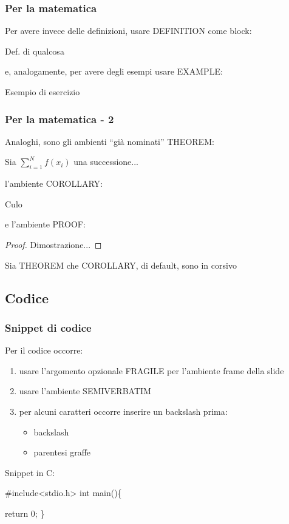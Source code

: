 \documentclass{beamer}[10]
\begin{document}
	\begin{frame}
		\frametitle{Per la matematica}
		Per avere invece delle definizioni, usare DEFINITION come block:
		\begin{definition}
			Def. di qualcosa
		\end{definition}
		e, analogamente, per avere degli esempi usare EXAMPLE:
		\begin{example}
			Esempio di esercizio
		\end{example}
	\end{frame}
	
	\begin{frame}
		\frametitle{Per la matematica - 2}
		Analoghi, sono gli ambienti ``già nominati'' THEOREM:
		\begin{theorem}
			Sia $\sum_{i=1}^N f(x_i)$ una successione...
		\end{theorem}
		l'ambiente COROLLARY:
		\begin{corollary}[Del teo che voglio]
			Culo
		\end{corollary}
		e l'ambiente PROOF:
		\begin{proof}
			Dimostrazione...
		\end{proof}
		Sia THEOREM che COROLLARY, di default, sono in corsivo
	\end{frame}
	
	\subsection{Codice}
	\begin{frame}[fragile]		%
		\frametitle{Snippet di codice}
		Per il codice occorre:
		\begin{enumerate}
			\item usare l'argomento opzionale FRAGILE per l'ambiente frame della slide
			\item usare l'ambiente SEMIVERBATIM
			\item per alcuni caratteri occorre inserire un backslash prima:
			\begin{itemize}
				\item backslash
				\item parentesi graffe
			\end{itemize}
		\end{enumerate}
		Snippet in C:
		\begin{semiverbatim}
			#include<stdio.h>
			int main()\{
			
			return 0;
			\}
		\end{semiverbatim}
	\end{frame}
	
\end{document}
